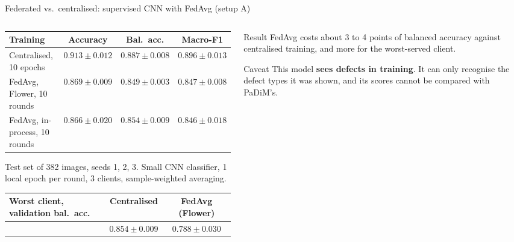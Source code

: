 \documentclass[aspectratio=169,10pt]{beamer}
\begin{document}
\begin{frame}{Federated vs.\ centralised: supervised CNN with FedAvg (setup A)}
  \begin{columns}[T]
    \begin{column}{0.6\textwidth}
      \footnotesize
      \setlength{\tabcolsep}{4pt}
      \begin{tabular}{lccc}
        \toprule
        Training & Accuracy & Bal.\ acc. & Macro-F1 \\
        \midrule
        Centralised, 10 epochs        & $0.913 \pm 0.012$ & $0.887 \pm 0.008$ & $0.896 \pm 0.013$ \\
        FedAvg, Flower, 10 rounds     & $0.869 \pm 0.009$ & $0.849 \pm 0.003$ & $0.847 \pm 0.008$ \\
        FedAvg, in-process, 10 rounds & $0.866 \pm 0.020$ & $0.854 \pm 0.009$ & $0.846 \pm 0.018$ \\
        \bottomrule
      \end{tabular}
      \par\vspace{0.15cm}
      {\footnotesize Test set of 382 images, seeds 1, 2, 3. Small CNN classifier, 1 local epoch per round,
      3 clients, sample-weighted averaging.}
      \par\vspace{0.25cm}
      \begin{tabular}{lcc}
        \toprule
        Worst client, validation bal.\ acc. & Centralised & FedAvg (Flower) \\
        \midrule
        & $0.854 \pm 0.009$ & $0.788 \pm 0.030$ \\
        \bottomrule
      \end{tabular}
    \end{column}
    \begin{column}{0.38\textwidth}
      \begin{block}{Result}
        FedAvg costs about \alert{3 to 4 points} of balanced accuracy against
        centralised training, and more for the worst-served client.
      \end{block}
      \begin{block}{Caveat}
        This model \textbf{sees defects in training}. It can only recognise the
        defect types it was shown, and its scores cannot be compared with PaDiM's.
      \end{block}
    \end{column}
  \end{columns}
\end{frame}
\end{document}
